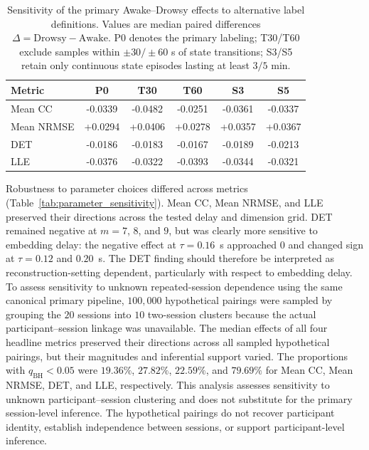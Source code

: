 \begin{table}[t]
\centering
\caption{Sensitivity of the primary Awake--Drowsy effects to alternative label definitions. Values are median paired differences $\Delta=\mathrm{Drowsy}-\mathrm{Awake}$. P0 denotes the primary labeling; T30/T60 exclude samples within $\pm30/\pm60$ s of state transitions; S3/S5 retain only continuous state episodes lasting at least $3/5$ min.}
\label{tab:label_sensitivity}
\footnotesize
\setlength{\tabcolsep}{4.5pt}
\renewcommand{\arraystretch}{1.08}
\begin{tabular}{lccccc}
\toprule
\textbf{Metric} & \textbf{P0} & \textbf{T30} & \textbf{T60} & \textbf{S3} & \textbf{S5} \\
\midrule
Mean CC
& -0.0339 & -0.0482 & -0.0251 & -0.0361 & -0.0337 \\
Mean NRMSE
& +0.0294 & +0.0406 & +0.0278 & +0.0357 & +0.0367 \\
DET
& -0.0186 & -0.0183 & -0.0167 & -0.0189 & -0.0213 \\
LLE
& -0.0376 & -0.0322 & -0.0393 & -0.0344 & -0.0321 \\
\bottomrule
\end{tabular}
\end{table}

Robustness to parameter choices differed across metrics (Table~\ref{tab:parameter_sensitivity}). Mean CC, Mean NRMSE, and LLE preserved their directions across the tested delay and dimension grid. DET remained negative at $m=7$, $8$, and $9$, but was clearly more sensitive to embedding delay: the negative effect at $\tau=0.16$~s approached $0$ and changed sign at $\tau=0.12$ and $0.20$~s. The DET finding should therefore be interpreted as reconstruction-setting dependent, particularly with respect to embedding delay. To assess sensitivity to unknown repeated-session dependence using the same canonical primary pipeline, $100{,}000$ hypothetical pairings were sampled by grouping the $20$ sessions into $10$ two-session clusters because the actual participant--session linkage was unavailable. The median effects of all four headline metrics preserved their directions across all sampled hypothetical pairings, but their magnitudes and inferential support varied. The proportions with $q_{\mathrm{BH}}<0.05$ were $19.36\%$, $27.82\%$, $22.59\%$, and $79.69\%$ for Mean CC, Mean NRMSE, DET, and LLE, respectively. This analysis assesses sensitivity to unknown participant--session clustering and does not substitute for the primary session-level inference. The hypothetical pairings do not recover participant identity, establish independence between sessions, or support participant-level inference.

